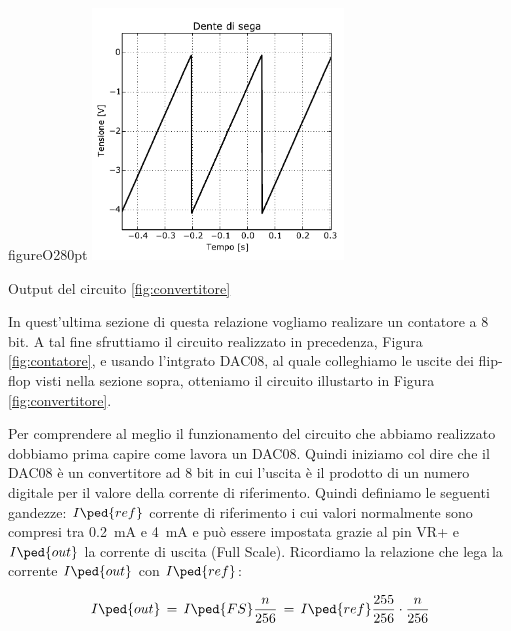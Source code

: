 \begin{wrapfloat}{figure}{O}{280pt}
\centering
    \includegraphics[width=0.5\textwidth]{figure/dds.pdf}
    \caption{Output del circuito \ref{fig:convertitore}}
    \label{fig:converter_plot}
\end{wrapfloat}

In quest'ultima sezione di questa relazione vogliamo realizare un contatore a 8 bit. A tal fine sfruttiamo il circuito realizzato in precedenza, Figura \ref{fig:contatore}, e usando l'intgrato DAC08, al quale colleghiamo le uscite dei flip-flop visti nella sezione sopra, otteniamo il circuito illustarto in Figura \ref{fig:convertitore}.

Per comprendere al meglio il funzionamento del circuito che abbiamo realizzato dobbiamo prima capire come lavora un DAC08. Quindi iniziamo col dire che il DAC08 è un convertitore ad 8 bit in cui l'uscita è il prodotto di un numero digitale per il valore della corrente di riferimento.
Quindi definiamo le seguenti gandezze: $I\ped{ref}$ corrente di riferimento i cui valori normalmente sono compresi tra \SI{0.2}{\milli\ampere} e \SI{4}{\milli\ampere} e può essere impostata grazie al pin VR+ e $I\ped{out}$ la corrente di uscita (Full Scale).
Ricordiamo la relazione che lega la corrente $I\ped{out}$ con $I\ped{ref}$:

\begin{equation}
	I\ped{out}\,=\, I\ped{FS} \frac{n}{256}\,=\,I\ped{ref} \frac{255}{256} \cdot \frac{n}{256}
	\label{eq:corrente}
\end{equation}

